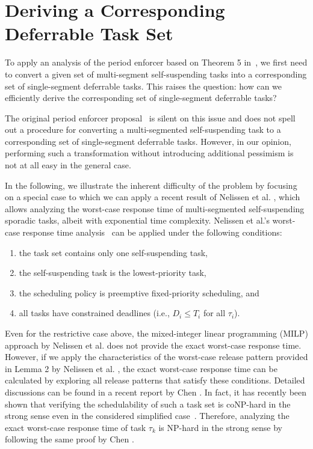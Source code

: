 
\section{Deriving a Corresponding Deferrable Task Set}
\label{sec:convert}

To apply an analysis of the period enforcer based on Theorem 5 in~\cite{Raj:suspension1991}, we first need to convert a given set of multi-segment self-suspending tasks into a corresponding set of single-segment deferrable tasks. This raises the question: how can we efficiently derive the corresponding set of single-segment deferrable tasks? 

The original period enforcer proposal~\cite{Raj:suspension1991} is silent on this issue and does not spell out a procedure for converting a multi-segmented self-suspending task to a corresponding set of single-segment deferrable tasks. However, in our opinion, performing such a transformation without introducing additional pessimism is not at all easy in the general case.

In the following, we illustrate the inherent difficulty of the problem by focusing on a special case to which we can apply a recent result of Nelissen et al. \cite{ecrts15nelissen}, which allows analyzing the worst-case response time of multi-segmented self-suspending sporadic tasks, albeit with exponential time complexity. 
Nelissen et al.'s worst-case response time analysis~\cite{ecrts15nelissen} can be applied under the following conditions:
\begin{enumerate}
	\item the task set contains only one self-suspending task, 
	\item the self-suspending task is the lowest-priority task, 
	\item the scheduling policy is preemptive fixed-priority scheduling, and 
	\item all tasks have constrained deadlines (i.e., $D_i \leq T_i$ for all $\tau_i$).
\end{enumerate}

Even for the restrictive case above, the mixed-integer linear programming (MILP) approach by Nelissen et al. \cite{ecrts15nelissen} does not provide the exact worst-case response time. 
However, if we apply the characteristics of the worst-case release pattern provided in Lemma 2 by Nelissen et al. \cite{ecrts15nelissen},  the exact worst-case response time can be calculated by exploring all  release patterns that satisfy these conditions. Detailed discussions can be found in a recent report by Chen \cite{Chen2016b}. In fact, it has recently been shown that verifying the schedulability of such a task set is coNP-hard in the strong sense even in the considered simplified case~\cite{RTSS2016-suspension}. Therefore, analyzing the exact worst-case response time of task $\tau_k$ is NP-hard in the strong sense by following the same proof by Chen \cite{RTSS2016-suspension}.


